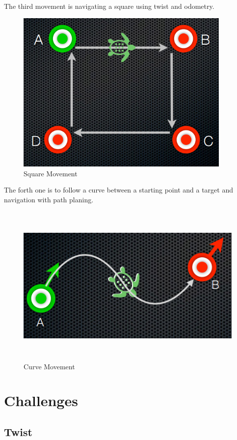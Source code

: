 \documentclass[aps,letterpaper,11pt]{revtex4}
\begin{document}
The third movement is navigating a square using twist and odometry.
\begin{figure}[H]
	\centering
	\includegraphics[height=8cm]{square.png}
	\caption{Square Movement}
	\label{fig: Square Movement}    
\end{figure}


The forth one is to follow a curve between a starting point and a target and navigation with path planing.
\begin{figure}[H]
	\centering
	\includegraphics[height=8cm]{curve.png}
	\caption{Curve Movement}
	\label{fig: Curve Movement}    
\end{figure}



\section{Challenges}
\subsection{Twist}
\end{document}
